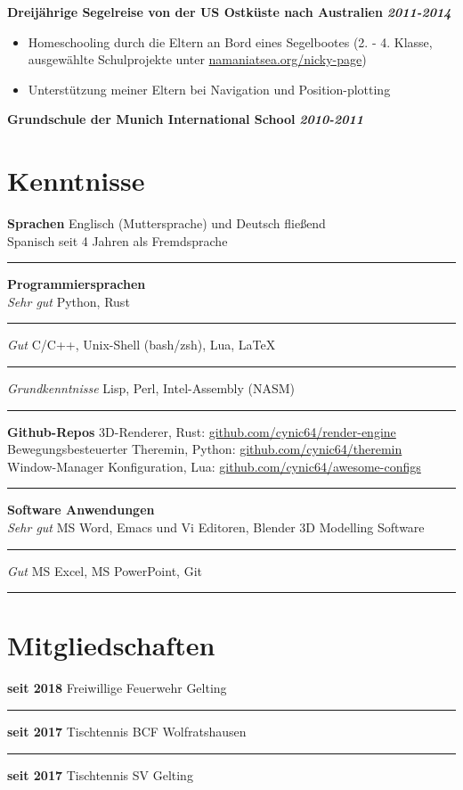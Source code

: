 \documentclass[12pt]{article}
\newcommand{\link}[1]{{\color{blue}\underline{#1}}}
\newcommand{\sect}[1]{
  {
    \vspace{12pt}
    \section*{
      \fontsize{18}{0}\selectfont
      \hspace{-12pt}
      \vspace{-12pt}
      #1
    }
    \vspace{-6pt}
  }
}
\newcommand{\sep}{{\color{gray}\vspace{-12pt}\hrule}}
\begin{document}
\textbf{Dreij{\"a}hrige Segelreise von der US Ostk{\"u}ste nach Australien} \hfill{\textit{\textbf{2011-2014}}}

\vspace{-18pt}
\begin{itemize}[leftmargin=*]
  \itemsep3pt

\item Homeschooling durch die Eltern an Bord eines Segelbootes (2. - 4. Klasse,
  ausgew{\"a}hlte Schulprojekte unter \link{namaniatsea.org/nicky-page})

\item Unterst{\"u}tzung meiner Eltern bei Navigation und Position-plotting

\end{itemize}
\vspace{-6pt}

\textbf{Grundschule der Munich International School} \hfill{\textit{\textbf{2010-2011}}}

\pagebreak

\sect{Kenntnisse}
\vspace{6pt}
\textbf{Sprachen} \hfill{Englisch (Muttersprache) und Deutsch flie{\ss}end} \\
\hspace*{\fill}Spanisch seit 4 Jahren als Fremdsprache \\
\sep
\vspace{12pt}

\textbf{Programmiersprachen} \\
\textit{Sehr gut} \hfill{Python, Rust} \\
\sep
\textit{Gut} \hfill{C/C++, Unix-Shell (bash/zsh), Lua, \LaTeX} \\
\sep
\textit{Grundkenntnisse} \hfill{Lisp, Perl, Intel-Assembly (NASM)} \\
\sep
\vspace{12pt}

{
  \small
  \textbf{Github-Repos} \hfill{3D-Renderer, Rust: \link{github.com/cynic64/render-engine}} \\
  \hspace*{\fill} Bewegungsbesteuerter Theremin, Python: \link{github.com/cynic64/theremin} \\
  \hspace*{\fill} Window-Manager Konfiguration, Lua:
  \link{github.com/cynic64/awesome-configs} \\
}
\sep
\vspace{12pt}

\textbf{Software Anwendungen} \\
\textit{Sehr gut} \hfill{MS Word, Emacs und Vi Editoren, Blender 3D Modelling Software} \\
\sep
\textit{Gut} \hfill{MS Excel, MS PowerPoint, Git} \\
\sep
\vspace{12pt}

\sect{Mitgliedschaften}

\textbf{seit 2018} \hfill{Freiwillige Feuerwehr Gelting} \\
\sep
\textbf{seit 2017} \hfill{Tischtennis BCF Wolfratshausen} \\
\sep
\textbf{seit 2017} \hfill{Tischtennis SV Gelting}
\end{document}
